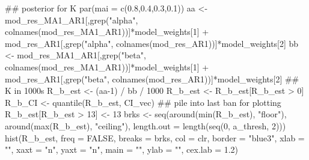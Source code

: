 \documentclass[
  11pt,
]{article}
\newenvironment{Shaded}{}{}
\newcommand{\CommentTok}[1]{\textcolor[rgb]{0.00,0.50,0.00}{#1}}
\newcommand{\DataTypeTok}[1]{#1}
\newcommand{\DecValTok}[1]{#1}
\newcommand{\FloatTok}[1]{#1}
\newcommand{\KeywordTok}[1]{\textcolor[rgb]{0.00,0.00,1.00}{#1}}
\newcommand{\NormalTok}[1]{#1}
\newcommand{\OperatorTok}[1]{#1}
\newcommand{\OtherTok}[1]{\textcolor[rgb]{1.00,0.25,0.00}{#1}}
\newcommand{\StringTok}[1]{\textcolor[rgb]{0.00,0.50,0.50}{#1}}
\begin{document}
\begin{Shaded}
\begin{Highlighting}[]
\CommentTok{## posterior for K}
\KeywordTok{par}\NormalTok{(}\DataTypeTok{mai =} \KeywordTok{c}\NormalTok{(}\FloatTok{0.8}\NormalTok{,}\FloatTok{0.4}\NormalTok{,}\FloatTok{0.3}\NormalTok{,}\FloatTok{0.1}\NormalTok{))}
\NormalTok{aa <-}\StringTok{ }\NormalTok{mod_res_MA1_AR1[,}\KeywordTok{grep}\NormalTok{(}\StringTok{"alpha"}\NormalTok{, }\KeywordTok{colnames}\NormalTok{(mod_res_MA1_AR1))]}\OperatorTok{*}\NormalTok{model_weights[}\DecValTok{1}\NormalTok{] }\OperatorTok{+}\StringTok{ }\NormalTok{mod_res_AR1[,}\KeywordTok{grep}\NormalTok{(}\StringTok{"alpha"}\NormalTok{, }\KeywordTok{colnames}\NormalTok{(mod_res_AR1))]}\OperatorTok{*}\NormalTok{model_weights[}\DecValTok{2}\NormalTok{] }
\NormalTok{bb <-}\StringTok{ }\NormalTok{mod_res_MA1_AR1[,}\KeywordTok{grep}\NormalTok{(}\StringTok{"beta"}\NormalTok{, }\KeywordTok{colnames}\NormalTok{(mod_res_MA1_AR1))]}\OperatorTok{*}\NormalTok{model_weights[}\DecValTok{1}\NormalTok{] }\OperatorTok{+}\StringTok{ }\NormalTok{mod_res_AR1[,}\KeywordTok{grep}\NormalTok{(}\StringTok{"beta"}\NormalTok{, }\KeywordTok{colnames}\NormalTok{(mod_res_AR1))]}\OperatorTok{*}\NormalTok{model_weights[}\DecValTok{2}\NormalTok{] }
\CommentTok{## K in 1000s}
\NormalTok{R_b_est <-}\StringTok{ }\NormalTok{(aa}\DecValTok{-1}\NormalTok{) }\OperatorTok{/}\StringTok{ }\NormalTok{bb }\OperatorTok{/}\StringTok{ }\DecValTok{1000}
\NormalTok{R_b_est <-}\StringTok{ }\NormalTok{R_b_est[R_b_est }\OperatorTok{>}\StringTok{ }\DecValTok{0}\NormalTok{]}
\NormalTok{R_b_CI <-}\StringTok{ }\KeywordTok{quantile}\NormalTok{(R_b_est, CI_vec)}
\CommentTok{## pile into last ban for plotting}
\NormalTok{R_b_est[R_b_est }\OperatorTok{>}\StringTok{ }\DecValTok{13}\NormalTok{] <-}\StringTok{ }\DecValTok{13}
\NormalTok{brks <-}\StringTok{ }\KeywordTok{seq}\NormalTok{(}\KeywordTok{around}\NormalTok{(}\KeywordTok{min}\NormalTok{(R_b_est), }\StringTok{"floor"}\NormalTok{),}
            \KeywordTok{around}\NormalTok{(}\KeywordTok{max}\NormalTok{(R_b_est), }\StringTok{"ceiling"}\NormalTok{),}
            \DataTypeTok{length.out =} \KeywordTok{length}\NormalTok{(}\KeywordTok{seq}\NormalTok{(}\DecValTok{0}\NormalTok{, a_thresh, }\DecValTok{2}\NormalTok{)))}
\KeywordTok{hist}\NormalTok{(R_b_est, }\DataTypeTok{freq =} \OtherTok{FALSE}\NormalTok{, }\DataTypeTok{breaks =}\NormalTok{ brks, }\DataTypeTok{col =}\NormalTok{ clr, }\DataTypeTok{border =} \StringTok{"blue3"}\NormalTok{,}
     \DataTypeTok{xlab =} \StringTok{""}\NormalTok{, }\DataTypeTok{xaxt =} \StringTok{"n"}\NormalTok{, }\DataTypeTok{yaxt =} \StringTok{"n"}\NormalTok{,}
     \DataTypeTok{main =} \StringTok{""}\NormalTok{, }\DataTypeTok{ylab =} \StringTok{""}\NormalTok{, }\DataTypeTok{cex.lab =} \FloatTok{1.2}\NormalTok{)}

\end{Highlighting}
\end{Shaded}
\end{document}
